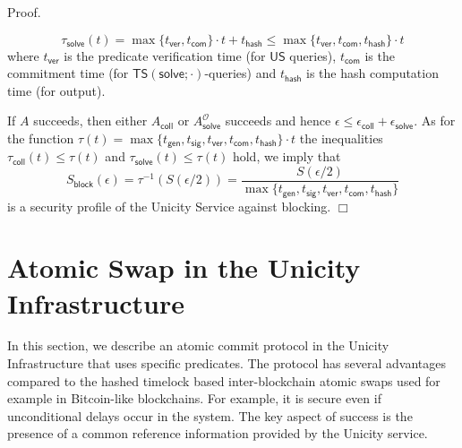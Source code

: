 \documentclass{article}
\newenvironment{proof}{\textsf{Proof}.}{\hfill$\Box$}
\newcommand{\unisrv}[0]{\mathsf{US}}
\begin{document}
\begin{proof}
\begin{itemize}
 \[
 \tau_\mathsf{solve}(t) = \max\{t_\mathsf{ver},t_\mathsf{com}\}\cdot t + t_\mathsf{hash}\le \max\{t_\mathsf{ver},t_\mathsf{com},t_\mathsf{hash}\}\cdot t\]
where
$t_\mathsf{ver}$ is the predicate verification time (for $\unisrv$ queries), $t_\mathsf{com}$ is the commitment time (for $\mathsf{TS}(\mathsf{solve};\cdot)$-queries) and
$t_\mathsf{hash}$ is the hash computation time (for output).
\end{itemize}
If $A$ succeeds, then either $A_\mathsf{coll}$ or $A_\mathsf{solve}^\mathcal{O}$ succeeds and hence $\epsilon \le \epsilon_\mathsf{coll} + \epsilon_\mathsf{solve}$.
As for the function $\tau(t)=\max\{t_\mathsf{gen}, t_\mathsf{sig}, t_\mathsf{ver},t_\mathsf{com},t_\mathsf{hash}\}\cdot t$ the inequalities $\tau_\mathsf{coll}(t)\le \tau(t)$
and $\tau_\mathsf{solve}(t)\le \tau(t)$ hold, we imply that
\[
S_\mathsf{block}(\epsilon) = \tau^{-1}(S(\epsilon/2)) =
\frac{S(\epsilon/2)}{\max\{t_\mathsf{gen}, t_\mathsf{sig}, t_\mathsf{ver},t_\mathsf{com},t_\mathsf{hash}\}}
\]
is a security profile of the Unicity Service against blocking.
\end{proof}

\section{Atomic Swap in the Unicity Infrastructure}\label{sec:swap}
In this section, we describe an atomic commit protocol in the Unicity Infrastructure that uses specific predicates. The protocol has several advantages compared to the hashed timelock based inter-blockchain atomic swaps used for example in Bitcoin-like blockchains. For example, it is secure even if unconditional delays occur in the system.
The key aspect of success is the presence of a common reference information provided by the Unicity service.
\end{document}
